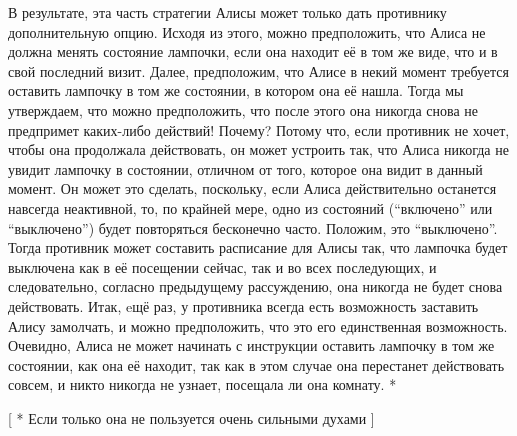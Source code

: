 В результате, эта часть стратегии Алисы может только дать противнику дополнительную опцию. Исходя из этого, можно предположить, что Алиса не должна менять состояние лампочки, если она находит её в том же виде, что и в свой последний визит.
   Далее, предположим, что Алисе в некий момент требуется оставить лампочку в том же состоянии, в котором она её нашла. Тогда мы утверждаем, что можно предположить, что после этого она никогда снова не предпримет  каких-либо действий! Почему?  Потому что, если противник не хочет, чтобы она продолжала действовать, он может устроить так, что Алиса никогда не увидит лампочку в состоянии, отличном от того, которое она видит в данный момент. Он может это сделать, поскольку, если Алиса действительно останется навсегда неактивной, то, по крайней мере, одно из состояний (“включено” или “выключено”)  будет повторяться бесконечно часто. Положим, это “выключено”. Тогда противник может составить расписание для  Алисы так, что лампочка будет выключена как в её посещении сейчас, так и во всех последующих, и следовательно, согласно предыдущему рассуждению, она никогда не будет снова действовать. Итак, eщё раз, у противника всегда есть возможность заставить  Алису замолчать, и можно предположить, что это его единственная возможность.
   Очевидно, Алиса не может начинать с инструкции оставить лампочку в том же состоянии, как она её находит, так как в этом случае она перестанет действовать совсем, и никто никогда не узнает, посещала ли она комнату. *


[ * Если только она не пользуется очень сильными духами ]


